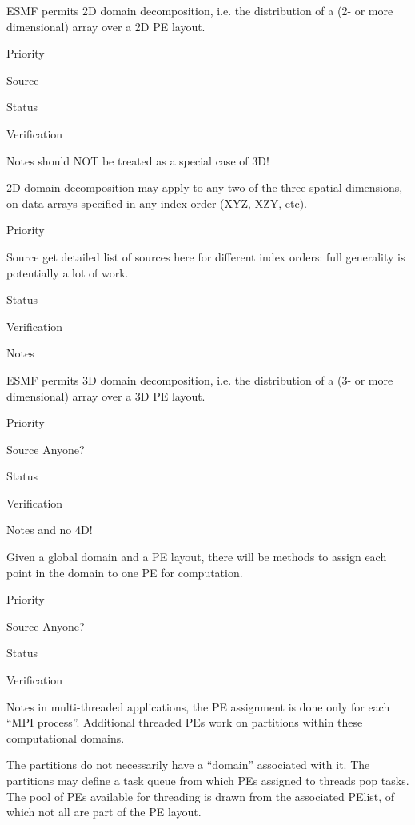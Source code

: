 ESMF permits 2D domain decomposition, i.e. the distribution of a
(2- or more dimensional) array over a 2D PE layout.

\begin{reqlist}
\item[Priority]
\item[Source]
\item[Status]
\item[Verification]
\item[Notes] should NOT be treated as a special case of 3D!
\end{reqlist}


2D domain decomposition may apply to any two of the three spatial
dimensions, on data arrays specified in any index order (XYZ, XZY,
etc).

\begin{reqlist}
\item[Priority]
\item[Source] get detailed list of sources here for different index
  orders: full generality is potentially a lot of work.
\item[Status]
\item[Verification]
\item[Notes]
\end{reqlist}


ESMF permits 3D domain decomposition, i.e. the distribution of a
(3- or more dimensional) array over a 3D PE layout.

\begin{reqlist}
\item[Priority]
\item[Source] Anyone?
\item[Status]
\item[Verification]
\item[Notes] and no 4D!
\end{reqlist}


Given a global domain and a PE layout, there will be methods to assign
each point in the domain to one PE for computation. 

\begin{reqlist}
\item[Priority]
\item[Source] Anyone?
\item[Status]
\item[Verification]
\item[Notes] in multi-threaded applications, the PE assignment is done
  only for each ``MPI process''. Additional threaded PEs work on
  partitions within these computational domains.

  The partitions do not necessarily have a ``domain'' associated with
  it. The partitions may define a task queue from which PEs assigned
  to threads pop tasks. The pool of PEs available for threading is
  drawn from the associated PElist, of which not all are part of the
  PE layout.
\end{reqlist}

